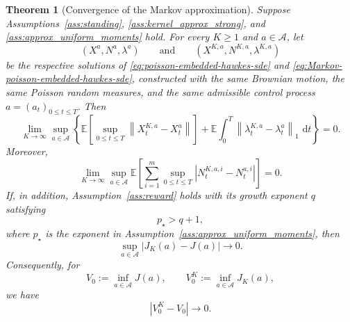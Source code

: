 \documentclass[11pt]{article}
\newtheorem{theorem}{Theorem}[section]
\theoremstyle{remarkitalic}
\theoremstyle{remarkitalic}
\newcommand{\E}{\mathbb E}
\newcommand{\dd}{\,\mathrm d}
\newcommand{\1}{\mathbf 1}
\newcommand{\norm}[1]{\left\lVert #1 \right\rVert}
\newcommand{\abs}[1]{\left\lvert #1\right\rvert}
\begin{document}
{\begin{theorem}[Convergence of the Markov approximation]
\label{thm:convergence}
Suppose Assumptions~\ref{ass:standing},
\ref{ass:kernel_approx_strong}, and
\ref{ass:approx_uniform_moments} hold. For every
$K\geq1$ and $a\in\mathcal A$, let
\[
(X^a,N^a,\lambda^a)
\qquad\text{and}\qquad
(X^{K,a},N^{K,a},\lambda^{K,a})
\]
be the respective solutions of
\eqref{eq:poisson-embedded-hawkes-sde} and
\eqref{eq:Markov-poisson-embedded-hawkes-sde}, constructed with the
same Brownian motion, the same Poisson random measures, and the same
admissible control process $a=(a_t)_{0\leq t\leq T}$. Then
\begin{equation}
\label{eq:process_convergence}
\lim_{K\to\infty}
\sup_{a\in\mathcal A}
\left\{
\E\left[
    \sup_{0\leq t\leq T}
    \norm{X_t^{K,a}-X_t^a}
\right]
+
\E\int_0^T
\norm{\lambda_t^{K,a}-\lambda_t^a}_1\,\dd t
\right\}
=0.
\end{equation}
Moreover,
\begin{equation}
\label{eq:counting_process_convergence}
\lim_{K\to\infty}
\sup_{a\in\mathcal A}
\E\left[
    \sum_{i=1}^m
    \sup_{0\leq t\leq T}
    \abs{N_t^{K,a,i}-N_t^{a,i}}
\right]
=0.
\end{equation} If, in addition, Assumption~\ref{ass:reward} holds with its growth
exponent $q$ satisfying
\[
p_\star>q+1,
\]
where $p_\star$ is the exponent in
Assumption~\ref{ass:approx_uniform_moments}, then
\[
\sup_{a\in\mathcal A}\abs{J_K(a)-J(a)}\longrightarrow0.
\]
Consequently, for
\[
V_0:=\inf_{a\in\mathcal A}J(a),
\qquad
V_0^K:=\inf_{a\in\mathcal A}J_K(a),
\]
we have
\[
\abs{V_0^K-V_0}\longrightarrow0.
\]
\end{theorem}

}
\end{document}
